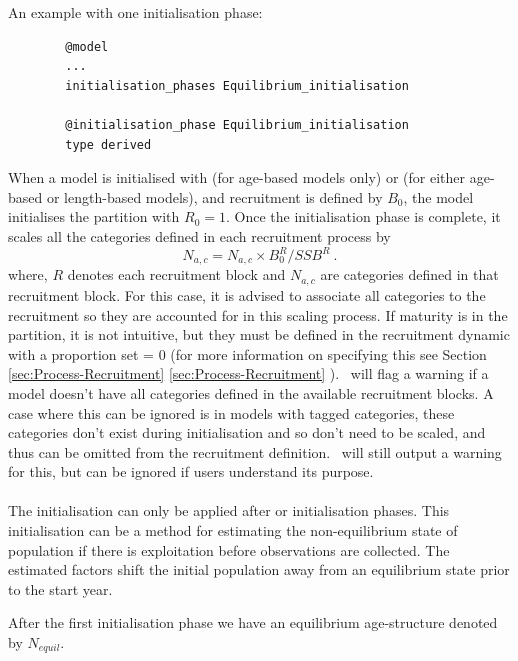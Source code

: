 An example with one initialisation phase:

{\small{\begin{verbatim}
		@model
		...
		initialisation_phases Equilibrium_initialisation

		@initialisation_phase Equilibrium_initialisation
		type derived
\end{verbatim}}}
\fi

When a model is initialised with  (for age-based models only) or  (for either age-based or length-based models),  and recruitment is defined by \(B_0\), the model initialises the partition with \(R_0 = 1\). Once the initialisation phase is complete, it scales all the categories defined in each recruitment process by
\[
N_{a,c}  = N_{a,c} \times B_0^R / SSB^R  \ .
\]
where, \(R\) denotes each recruitment block and \(N_{a,c}\) are categories defined in that recruitment block. For this case, it is advised to associate all categories to the recruitment so they are accounted for in this scaling process. If maturity is in the partition, it is not intuitive, but they must be defined in the recruitment dynamic with a proportion set = 0 (for more information on specifying this see Section 
\ifAgeBased \ref{sec:Process-Recruitment} \else \ref{sec:Process-Recruitment} \fi). \CNAME\ will flag a warning if a model doesn't have all categories defined in the available recruitment blocks. A case where this can be ignored is in models with tagged categories, these categories don't exist during initialisation and so don't need to be scaled, and thus can be omitted from the recruitment definition. \CNAME\ will still output a warning for this, but can be ignored if users understand its purpose.

\ifAgeBased
\paragraph{}\label{sec:InitialisationPhase-Cinitial} 

The  initialisation can only be applied after  or  initialisation phases. This initialisation can be a method for estimating the non-equilibrium state of population if there is exploitation before observations are collected. The estimated  factors shift the initial population away from an equilibrium state prior to the start year.

After the first initialisation phase we have an equilibrium age-structure denoted by $N_{equil}$.

